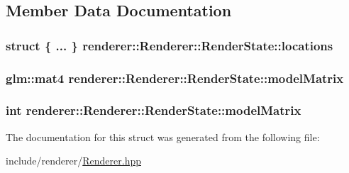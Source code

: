 \subsection{Member Data Documentation}
\hypertarget{structrenderer_1_1Renderer_1_1RenderState_aa750038563eb386163b945d56d7acc29}{
\subsubsection[{locations}]{\setlength{\rightskip}{0pt plus 5cm}struct \{ ... \}   renderer\-::\-Renderer\-::\-Render\-State\-::locations}}\label{structrenderer_1_1Renderer_1_1RenderState_aa750038563eb386163b945d56d7acc29}
\hypertarget{structrenderer_1_1Renderer_1_1RenderState_a9fbdbf3d5dbe35a048d01f41f1d9f49f}{
\subsubsection[{model\-Matrix}]{\setlength{\rightskip}{0pt plus 5cm}glm\-::mat4 renderer\-::\-Renderer\-::\-Render\-State\-::model\-Matrix}}\label{structrenderer_1_1Renderer_1_1RenderState_a9fbdbf3d5dbe35a048d01f41f1d9f49f}
\hypertarget{structrenderer_1_1Renderer_1_1RenderState_a90fddf7b9069e609f9716510c68fe21d}{
\subsubsection[{model\-Matrix}]{\setlength{\rightskip}{0pt plus 5cm}int renderer\-::\-Renderer\-::\-Render\-State\-::model\-Matrix}}\label{structrenderer_1_1Renderer_1_1RenderState_a90fddf7b9069e609f9716510c68fe21d}


The documentation for this struct was generated from the following file\-:\begin{DoxyCompactItemize}
\item 
include/renderer/\hyperlink{Renderer_8hpp}{Renderer.\-hpp}\end{DoxyCompactItemize}
